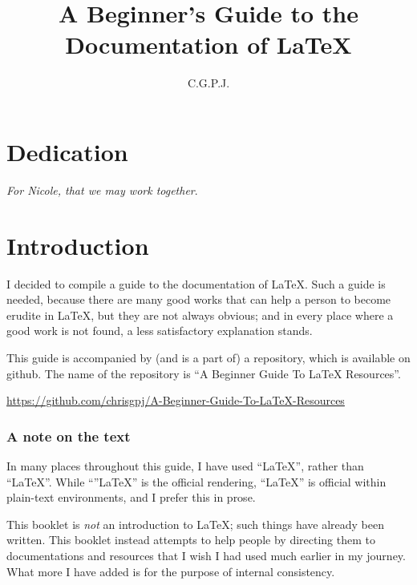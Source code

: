 \documentclass[11pt, oneside]{memoir}
\title{A Beginner's Guide to the Documentation of \LaTeX{}}
\author{C.\thinspace G.\thinspace P.\thinspace J.\thinspace}
\begin{document}
\maketitle
\thispagestyle{empty}

\RaggedRight

\chapter*{Dedication}
\emph{For Nicole, that we may work together}.

\newpage
\tableofcontents

\chapter{Introduction}
I decided to compile a guide to the documentation of \LaTeX{}. Such a guide is needed, because there are many good works that can help a person to become erudite in \LaTeX{}, but they are not always obvious; and in every place where a good work is not found, a less satisfactory explanation stands.

This guide is accompanied by (and is a part of) a repository, which is available on github. The name of the repository is ``A Beginner Guide To LaTeX Resources''.

\url{https://github.com/chrisgpj/A-Beginner-Guide-To-LaTeX-Resources}

\subsection{A note on the text}
In many places throughout this guide, I have used ``LaTeX'', rather than ``\LaTeX{}''. While ``''\LaTeX{}'' is the official rendering, ``LaTeX'' is official within plain-text environments, and I prefer this in prose.

This booklet is \emph{not} an introduction to LaTeX; such things have already been written. This booklet instead attempts to help people by directing them to documentations and resources that I wish I had used much earlier in my journey. What more I have added is for the purpose of internal consistency.

\end{document}
